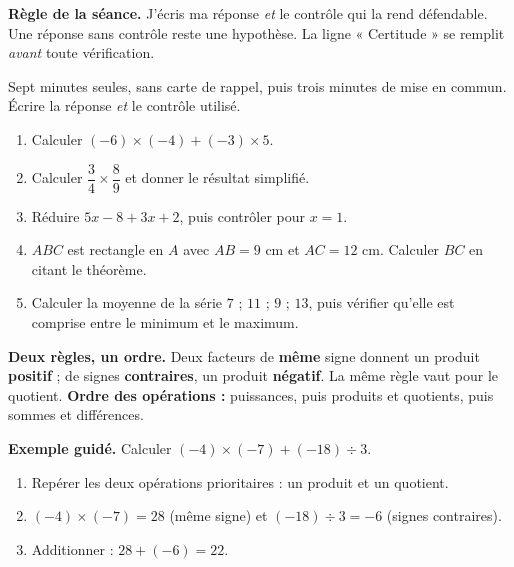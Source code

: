\documentclass[10pt,a4paper]{article}
\begin{document}
\begin{graybox}\small\textbf{Règle de la séance.} J'écris ma réponse \emph{et} le contrôle qui la rend défendable. Une réponse sans contrôle reste une hypothèse. La ligne « Certitude » se remplit \emph{avant} toute vérification.\end{graybox}
\par\vspace{2mm}
Sept minutes seules, sans carte de rappel, puis trois minutes de mise en commun. Écrire la réponse \emph{et} le contrôle utilisé.
\begin{enumerate}
\item Calculer $(-6)\times(-4) + (-3)\times 5$.
\item Calculer $\dfrac{3}{4}\times\dfrac{8}{9}$ et donner le résultat simplifié.
\item Réduire $5x - 8 + 3x + 2$, puis contrôler pour $x = 1$.
\item $ABC$ est rectangle en $A$ avec $AB = 9$ cm et $AC = 12$ cm. Calculer $BC$ en citant le théorème.
\item Calculer la moyenne de la série $7$ ; $11$ ; $9$ ; $13$, puis vérifier qu'elle est comprise entre le minimum et le maximum.
\end{enumerate}
\certline
\aideline
\needspace{62mm}\par\vspace{3mm}
\begin{methodbox}
\textbf{Deux règles, un ordre.} Deux facteurs de \textbf{même} signe donnent un produit \textbf{positif} ;
de signes \textbf{contraires}, un produit \textbf{négatif}. La même règle vaut pour le quotient.
\textbf{Ordre des opérations :} puissances, puis produits et quotients, puis sommes et différences.
\end{methodbox}
\begin{graybox}
\textbf{Exemple guidé.} Calculer $(-4)\times(-7) + (-18)\div 3$.
\begin{enumerate}
\item Repérer les deux opérations prioritaires : un produit et un quotient.
\item $(-4)\times(-7)=28$ (même signe) et $(-18)\div 3=-6$ (signes contraires).
\item Additionner : $28 + (-6) = 22$.
\end{enumerate}
\end{graybox}
\end{document}
